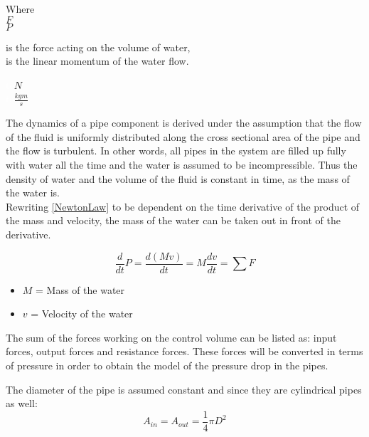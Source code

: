 \begin{minipage}[t]{0.20\textwidth}
Where\\
\hspace*{8mm} $F$ \\
\hspace*{8mm} $P$ 
\end{minipage}
\begin{minipage}[t]{0.68\textwidth}
\vspace*{2mm}
is the force acting on the volume of water,\\
is the linear momentum of the water flow.

\end{minipage}
\begin{minipage}[t]{0.10\textwidth}
\vspace*{2mm}
\textcolor{White}{te}$\unit{N}$\\
\textcolor{White}{te}$\unit{\frac{kgm}{s}}$
\end{minipage}

The dynamics of a pipe component is derived under the assumption that the flow of the fluid is uniformly distributed along the cross sectional area of the pipe and the flow is turbulent. In other words, all pipes in the system are filled up fully with water all the time and the water is assumed to be incompressible. Thus the density of water and the volume of the fluid is constant in time, as the mass of the water is.
\\
Rewriting \ref{NewtonLaw} to be dependent on the time derivative of the product of the mass and velocity, the mass of the water can be taken out in front of the derivative.

\begin{equation}
  \frac{d}{dt} P = {\frac{d(M v)}{dt}} = M \frac{dv}{dt} = \sum F
\end{equation} 

\begin{itemize}
  \item  $M$ = Mass of the water
  \item $v$ = Velocity of the water
\end{itemize}

The sum of the forces working on the control volume can be listed as: input forces, output forces and resistance forces.  
These forces will be converted in terms of pressure in order to obtain the model of the pressure drop in the pipes. 

The diameter of the pipe is assumed constant and since they are cylindrical pipes as well:
\begin{equation}
  A_{in} = A_{out} = \frac{1}{4}\pi D^{2}
\end{equation}

